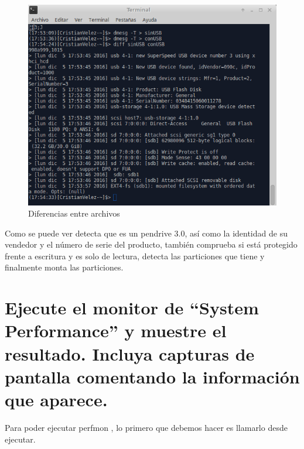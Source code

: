 \begin{figure}[H] %
	\centering
	\includegraphics[scale=0.5]{pics/USB3.png}  %
	\caption{Diferencias entre archivos} \label{fig:usb3}
\end{figure}

Como se puede ver detecta que es un pendrive 3.0, así como la identidad de su vendedor y el número de serie del producto, también comprueba si está protegido frente a escritura y es solo de lectura, detecta las particiones que tiene y finalmente monta las particiones.



\section[Cuestión 4]{Ejecute el monitor de “System Performance” y muestre el resultado. Incluya capturas de pantalla comentando la información que aparece.}

Para poder ejecutar perfmon \cite{perfmon}, lo primero que debemos hacer es llamarlo desde ejecutar.

